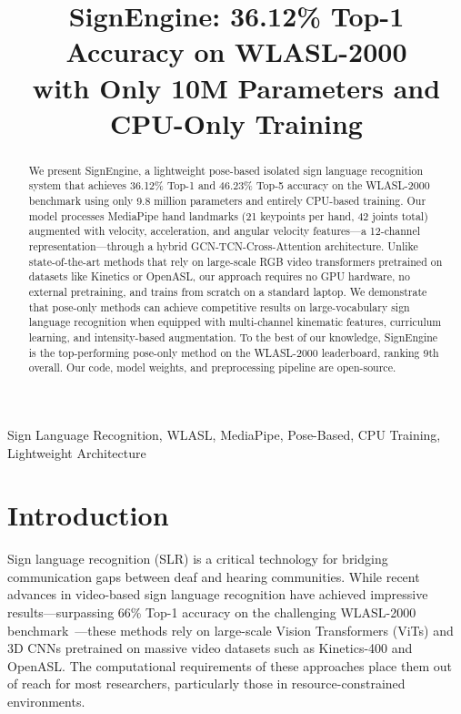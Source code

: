 \documentclass[conference]{IEEEtran}
\begin{document}
\title{SignEngine: 36.12\% Top-1 Accuracy on WLASL-2000 \\ with Only 10M Parameters and CPU-Only Training}

\author{
}

\maketitle

\begin{abstract}
We present SignEngine, a lightweight pose-based isolated sign language recognition system that achieves 36.12\% Top-1 and 46.23\% Top-5 accuracy on the WLASL-2000 benchmark using only 9.8 million parameters and entirely CPU-based training. Our model processes MediaPipe hand landmarks (21 keypoints per hand, 42 joints total) augmented with velocity, acceleration, and angular velocity features---a 12-channel representation---through a hybrid GCN-TCN-Cross-Attention architecture. Unlike state-of-the-art methods that rely on large-scale RGB video transformers pretrained on datasets like Kinetics or OpenASL, our approach requires no GPU hardware, no external pretraining, and trains from scratch on a standard laptop. We demonstrate that pose-only methods can achieve competitive results on large-vocabulary sign language recognition when equipped with multi-channel kinematic features, curriculum learning, and intensity-based augmentation. To the best of our knowledge, SignEngine is the top-performing pose-only method on the WLASL-2000 leaderboard, ranking 9th overall. Our code, model weights, and preprocessing pipeline are open-source.
\end{abstract}

\begin{IEEEkeywords}
Sign Language Recognition, WLASL, MediaPipe, Pose-Based, CPU Training, Lightweight Architecture
\end{IEEEkeywords}

\section{Introduction}

Sign language recognition (SLR) is a critical technology for bridging communication gaps between deaf and hearing communities. While recent advances in video-based sign language recognition have achieved impressive results---surpassing 66\% Top-1 accuracy on the challenging WLASL-2000 benchmark~\cite{logos2025}---these methods rely on large-scale Vision Transformers (ViTs) and 3D CNNs pretrained on massive video datasets such as Kinetics-400 and OpenASL. The computational requirements of these approaches place them out of reach for most researchers, particularly those in resource-constrained environments.
\end{document}
